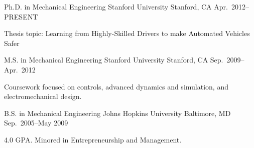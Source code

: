 \begin{cventries}
  \cventry%
    {Ph.D. in Mechanical Engineering}
    {Stanford University}
    {Stanford, CA}
    {Apr.\ 2012--PRESENT}
    {
      \begin{cvitems}
        \item{Thesis topic: Learning from Highly-Skilled Drivers to make Automated Vehicles Safer}
      \end{cvitems}
    }

  \cventry
    {M.S. in Mechanical Engineering}
    {Stanford University}
    {Stanford, CA}
    {Sep.\ 2009--Apr.\ 2012}
    {
      \begin{cvitems}
        \item{Coursework focused on controls, advanced dynamics and simulation, and electromechanical design.}
      \end{cvitems}
    }

  \cventry
    {B.S. in Mechanical Engineering}
    {Johns Hopkins University}
    {Baltimore, MD}
    {Sep.\ 2005--May 2009}
    {
      \begin{cvitems}
        \item{4.0 GPA\@. Minored in Entrepreneurship and Management.}
      \end{cvitems}
    }
\end{cventries}

